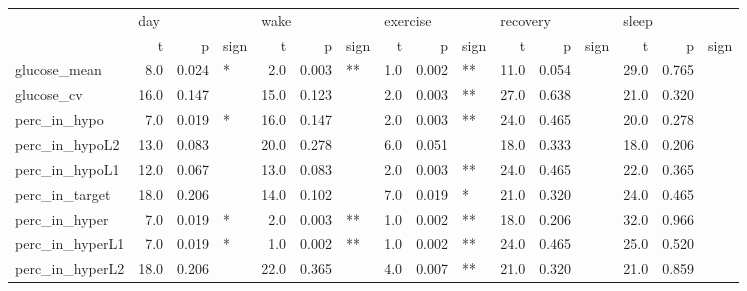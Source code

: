 \begin{tabular}{lrrlrrlrrlrrlrrl}
\toprule
{} & \multicolumn{3}{l}{day} & \multicolumn{3}{l}{wake} & \multicolumn{3}{l}{exercise} & \multicolumn{3}{l}{recovery} & \multicolumn{3}{l}{sleep} \\
{} &     t &      p & sign &     t &      p & sign &        t &      p & sign &        t &      p & sign &     t &      p & sign \\
\midrule
glucose_mean    &   8.0 &  0.024 &    * &   2.0 &  0.003 &   ** &      1.0 &  0.002 &   ** &     11.0 &  0.054 &      &  29.0 &  0.765 &      \\
glucose_cv      &  16.0 &  0.147 &      &  15.0 &  0.123 &      &      2.0 &  0.003 &   ** &     27.0 &  0.638 &      &  21.0 &  0.320 &      \\
perc_in_hypo    &   7.0 &  0.019 &    * &  16.0 &  0.147 &      &      2.0 &  0.003 &   ** &     24.0 &  0.465 &      &  20.0 &  0.278 &      \\
perc_in_hypoL2  &  13.0 &  0.083 &      &  20.0 &  0.278 &      &      6.0 &  0.051 &      &     18.0 &  0.333 &      &  18.0 &  0.206 &      \\
perc_in_hypoL1  &  12.0 &  0.067 &      &  13.0 &  0.083 &      &      2.0 &  0.003 &   ** &     24.0 &  0.465 &      &  22.0 &  0.365 &      \\
perc_in_target  &  18.0 &  0.206 &      &  14.0 &  0.102 &      &      7.0 &  0.019 &    * &     21.0 &  0.320 &      &  24.0 &  0.465 &      \\
perc_in_hyper   &   7.0 &  0.019 &    * &   2.0 &  0.003 &   ** &      1.0 &  0.002 &   ** &     18.0 &  0.206 &      &  32.0 &  0.966 &      \\
perc_in_hyperL1 &   7.0 &  0.019 &    * &   1.0 &  0.002 &   ** &      1.0 &  0.002 &   ** &     24.0 &  0.465 &      &  25.0 &  0.520 &      \\
perc_in_hyperL2 &  18.0 &  0.206 &      &  22.0 &  0.365 &      &      4.0 &  0.007 &   ** &     21.0 &  0.320 &      &  21.0 &  0.859 &      \\
\bottomrule
\end{tabular}
